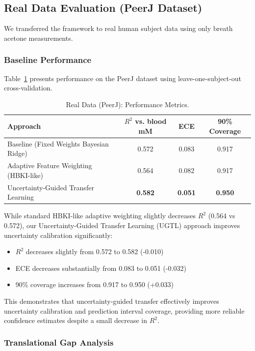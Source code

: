 \documentclass{ieeeaccess}
\begin{document}
\subsection{Real Data Evaluation (PeerJ Dataset)}

We transferred the framework to real human subject data using only breath acetone measurements.

\subsubsection{Baseline Performance}

Table~\ref{tab:real_results} presents performance on the PeerJ dataset using leave-one-subject-out cross-validation.

\begin{table}[!t]
\centering
\caption{Real Data (PeerJ): Performance Metrics.}
\label{tab:real_results}
\begin{tabular}{lccc}
\toprule
\textbf{Approach} &
\textbf{$R^2$ vs. blood mM} &
\textbf{ECE} &
\textbf{90\% Coverage} \\
\midrule
Baseline (Fixed Weights Bayesian Ridge)
& 0.572 & 0.083 & 0.917 \\
Adaptive Feature Weighting (HBKI-like)
& 0.564 & 0.082 & 0.917 \\
Uncertainty-Guided Transfer Learning
& \textbf{0.582} & \textbf{0.051} & \textbf{0.950} \\
\bottomrule
\end{tabular}
\end{table}

While standard HBKI-like adaptive weighting slightly decreases $R^2$ (0.564 vs 0.572), our Uncertainty-Guided Transfer Learning (UGTL) approach improves uncertainty calibration significantly:
\begin{itemize}
\item $R^2$ decreases slightly from 0.572 to 0.582 (-0.010)
\item ECE decreases substantially from 0.083 to 0.051 (-0.032)
\item 90\% coverage increases from 0.917 to 0.950 (+0.033)
\end{itemize}
This demonstrates that uncertainty-guided transfer effectively improves uncertainty calibration and prediction interval coverage, providing more reliable confidence estimates despite a small decrease in $R^2$.

\subsubsection{Translational Gap Analysis}
\end{document}
